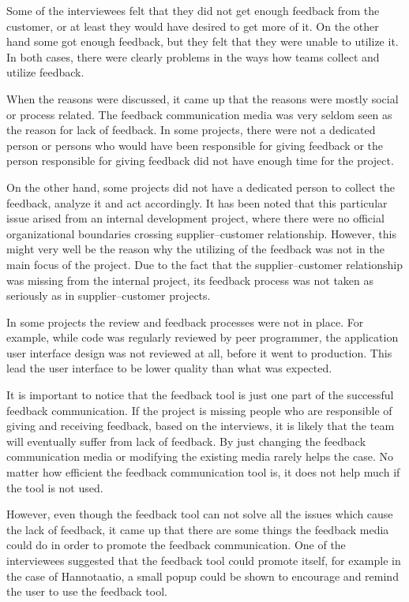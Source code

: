 \documentclass[english,12pt,a4paper,pdftex]{article}
\begin{document}
Some of the interviewees felt that they did not get enough feedback from the customer, or at least they would have desired to get more of it. On the other hand some got enough feedback, but they felt that they were unable to utilize it. In both cases, there were clearly problems in the ways how teams collect and utilize feedback.

When the reasons were discussed, it came up that the reasons were mostly social or process related. The feedback communication media was very seldom seen as the reason for lack of feedback. In some projects, there were not a dedicated person or persons who would have been responsible for giving feedback or the person responsible for giving feedback did not have enough time for the project. 

On the other hand, some projects did not have a dedicated person to collect the feedback, analyze it and act accordingly. It has been noted that this particular issue arised from an internal development project, where there were no official organizational boundaries crossing supplier--customer relationship. However, this might very well be the reason why the utilizing of the feedback was not in the main focus of the project. Due to the fact that the supplier--customer relationship was missing from the internal project, its feedback process was not taken as seriously as in supplier--customer projects.

In some projects the review and feedback processes were not in place. For example, while code was regularly reviewed by peer programmer, the application user interface design was not reviewed at all, before it went to production. This lead the user interface to be lower quality than what was expected.

It is important to notice that the feedback tool is just one part of the successful feedback communication. If the project is missing people who are responsible of giving and receiving feedback, based on the interviews, it is likely that the team will eventually suffer from lack of feedback. By just changing the feedback communication media or modifying the existing media rarely helps the case. No matter how efficient the feedback communication tool is, it does not help much if the tool is not used.

However, even though the feedback tool can not solve all the issues which cause the lack of feedback, it came up that there are some things the feedback media could do in order to promote the feedback communication. One of the interviewees suggested that the feedback tool could promote itself, for example in the case of Hannotaatio, a small popup could be shown to encourage and remind the user to use the feedback tool. 
\end{document}
